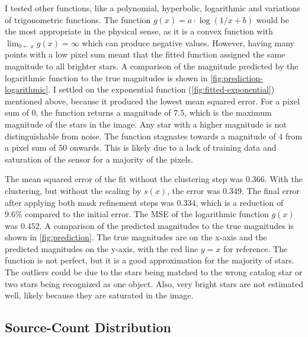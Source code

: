I tested other functions, like a polynomial, hyperbolic, logarithmic and variations of
trigonometric functions. The function $g(x) = a \cdot \log(1 / x + b)$ would be the most
appropriate in the physical sense, as it is a convex function with $\lim_{0 \leftarrow x}
  g(x) = \infty$ which can produce negative values. However, having many points with a low
pixel sum meant that the fitted function assigned the same magnitude to all brighter
stars. A comparison of the magnitude predicted by the logarithmic function to the true
magnitudes is shown in \autoref{fig:prediction-logarithmic}. I settled on the exponential
function (\autoref{fig:fitted-exponential}) mentioned above, because it produced the
lowest mean squared error. For a pixel sum of 0, the function returns a magnitude of
$7.5$, which is the maximum magnitude of the stars in the image. Any star with a higher
magnitude is not distinguishable from noise. The function stagnates towards a magnitude of
$4$ from a pixel sum of $50$ onwards. This is likely due to a lack of training data and
saturation of the sensor for a majority of the pixels.

The mean squared error of the fit without the clustering step was $0.366$. With the
clustering, but without the scaling by $s(x)$, the error was $0.349$. The final error
after applying both mask refinement steps was $0.334$, which is a reduction of $9.6\%$
compared to the initial error. The MSE of the logarithmic function $g(x)$ was $0.452$. A
comparison of the predicted magnitudes to the true magnitudes is shown in
\autoref{fig:prediction}. The true magnitudes are on the x-axis and the predicted
magnitudes on the y-axis, with the red line $y = x$ for reference. The function is not
perfect, but it is a good approximation for the majority of stars. The outliers could be
due to the stars being matched to the wrong catalog star or two stars being recognized as
one object. Also, very bright stars are not estimated well, likely because they are
saturated in the image.

\subsection{Source-Count Distribution}
\label{sec:source-count-distribution}

